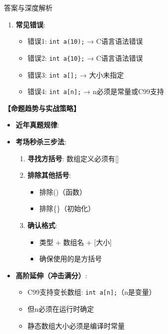 \documentclass[a4paper,12pt]{article}
\begin{document}
\begin{bluebox}{答案与深度解析}
\begin{enumerate}[leftmargin=*, nosep]
		\item \textbf{常见错误}:
		      \begin{itemize}
			      \item 错误1: \texttt{int a(10);} → C语言语法错误
			      \item 错误2: \texttt{int a\{10\};} → C语言语法错误
			      \item 错误3: \texttt{int a[];} → 大小未指定
			      \item 错误4: \texttt{int a[n];} → n必须是常量或C99支持
		      \end{itemize}
	\end{enumerate}

	\textbf{【命题趋势与实战策略】}
	\begin{itemize}[leftmargin=*, nosep]
		\item \textbf{近年真题规律}:
		      \begin{itemize}
			      \item 50\%考题混淆()和\[]
			      \item 30\%考题误用\{\}定义
			      \item 20\%考题变量名与数组名混淆
		      \end{itemize}

		\item \textbf{考场秒杀三步法}:
		      \begin{enumerate}
			      \item \textbf{寻找方括号}: 数组定义必须有[]
			      \item \textbf{排除其他括号}:
			            \begin{itemize}
				            \item 排除()（函数）
				            \item 排除\{\}（初始化）
			            \end{itemize}
			      \item \textbf{确认格式}:
			            \begin{itemize}
				            \item 类型 + 数组名 + [大小]
				            \item 确保使用的是方括号
			            \end{itemize}
		      \end{enumerate}

		\item \textbf{高阶延伸（冲击满分）}:
		      \begin{itemize}
			      \item C99支持变长数组: \texttt{int a[n];}（n是变量）
			      \item 但n必须在运行时确定
			      \item 静态数组大小必须是编译时常量
		      \end{itemize}
	\end{itemize}
\end{bluebox}
\end{document}
